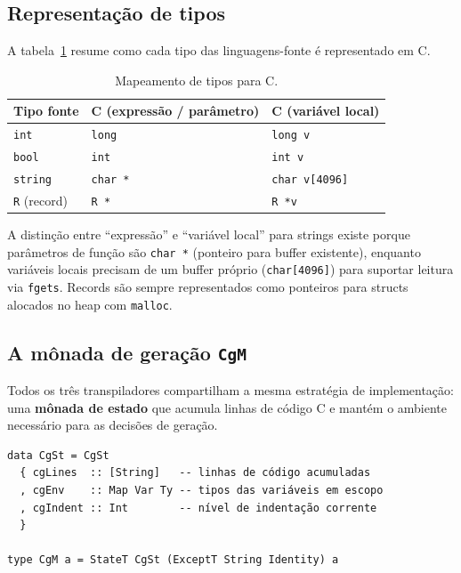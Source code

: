 \subsection{Representação de tipos}

A tabela~\ref{tab:tipo-c} resume como cada tipo das linguagens-fonte é
representado em C.

\begin{table}[htbp]
  \centering
  \begin{tabular}{lll}
    \hline
    \textbf{Tipo fonte} & \textbf{C (expressão / parâmetro)} &
    \textbf{C (variável local)} \\
    \hline
    \texttt{int}        & \texttt{long}    & \texttt{long v}         \\
    \texttt{bool}       & \texttt{int}     & \texttt{int v}          \\
    \texttt{string}     & \texttt{char *}  & \texttt{char v[4096]}   \\
    \texttt{R} (record) & \texttt{R *}     & \texttt{R *v}           \\
    \hline
  \end{tabular}
  \caption{Mapeamento de tipos para C.}\label{tab:tipo-c}
\end{table}

A distinção entre ``expressão'' e ``variável local'' para strings existe porque
parâmetros de função são \texttt{char *} (ponteiro para buffer existente),
enquanto variáveis locais precisam de um buffer próprio (\texttt{char[4096]})
para suportar leitura via \texttt{fgets}.  Records são sempre representados
como ponteiros para structs alocados no heap com \texttt{malloc}.

\subsection{A mônada de geração \texttt{CgM}}

Todos os três transpiladores compartilham a mesma estratégia de
implementação: uma \textbf{mônada de estado} que acumula linhas de código C
e mantém o ambiente necessário para as decisões de geração.

\begin{verbatim}
data CgSt = CgSt
  { cgLines  :: [String]   -- linhas de código acumuladas
  , cgEnv    :: Map Var Ty -- tipos das variáveis em escopo
  , cgIndent :: Int        -- nível de indentação corrente
  }

type CgM a = StateT CgSt (ExceptT String Identity) a
\end{verbatim}


